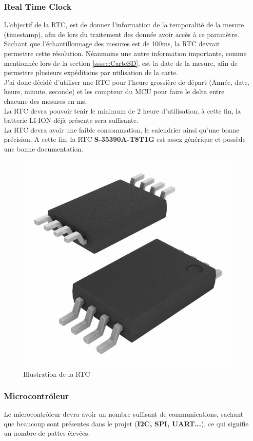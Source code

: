 {\newpage
\subsubsection{Real Time Clock}
{
    L'objectif de la RTC, est de donner l'information de la temporalité de la mesure (timestamp), afin de lors du traitement des donnée avoir accès à ce paramètre. \\
    Sachant que l'échantillonnage des mesures est de 100ms, la RTC devrait permettre cette résolution. Néanmoins une autre information importante, comme mentionnée lors de la section \ref{sssec:CarteSD}, est la date de la mesure, afin de permettre plusieurs expéditions par utilisation de la carte. \vspace{+8pt} \\
    J'ai donc décidé d'utiliser une RTC pour l'heure grossière de départ (Année, date, heure, minute, seconde) et les compteur du MCU pour faire le delta entre chacune des mesures en ms. \\

    La RTC devra pouvoir tenir le minimum de 2 heure d'utilisation, à cette fin, la batterie LI-ION déjà présente sera suffisante. \\ 
    La RTC devra avoir une faible consommation, le calendrier ainsi qu'une bonne précision. A cette fin, la RTC \textbf{S-35390A-T8T1G} est assez générique et possède une bonne documentation.
    
    \begin{figure}[h] 
        \centering
        \includegraphics[width=.4\textwidth]{Figures/RTC}
        \caption{Illustration de la RTC}
        \label{fig:RTC}
    \end{figure}    
    
}
\clearpage

\subsubsection{Microcontrôleur}
{
    Le microcontrôleur devra avoir un nombre suffisant de communications, sachant que beaucoup sont présentes dans le projet (\textbf{I2C, SPI, UART...}), ce qui signifie un nombre de pattes élevées. 
    
}}
